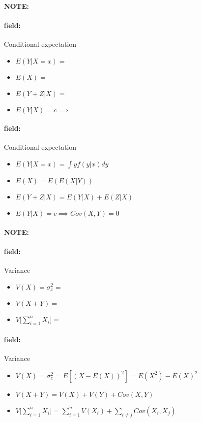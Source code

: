 \documentclass[12pt]{article}
\newenvironment{note}{\paragraph{NOTE:}}{}
\newenvironment{field}{\paragraph{field:}}{}
\begin{document}
\begin{note}
  \begin{field}
    Conditional expectation
      \begin{itemize}
        \item $E(Y|X = x) = $
        \item $E(X) = $
        \item $E(Y+Z|X) = $
        \item $E(Y|X) = c \implies $
      \end{itemize}
  \end{field}
  \begin{field}
    Conditional expectation
      \begin{itemize}
        \item $E(Y|X = x) = \int y f(y|x) dy$
        \item $E(X) = E(E(X|Y))$
        \item $E(Y+Z|X) = E(Y|X) + E(Z|X)$
        \item $E(Y|X) = c \implies Cov(X,Y) = 0$
      \end{itemize}

  \end{field}
\end{note}


\begin{note}
  \begin{field}
    Variance
    \begin{itemize}
      \item $V(X) = \sigma_x^2 = $
      \item $V(X+Y) =$
      \item $V\bigg[\sum_{i=1}^n X_i\bigg] = $
    \end{itemize}
  \end{field}
  \begin{field}
    Variance
    \begin{itemize}
      \item $V(X) = \sigma_x^2 = E[(X - E(X))^2] = E(X^2) - E(X)^2$
      \item $V(X+Y) = V(X) + V(Y) + Cov(X,Y)$
      \item $V\bigg[\sum_{i=1}^n X_i\bigg] = \sum_{i=1}^n V(X_i) + \sum_{i\neq j} Cov(X_i,X_j)$
    \end{itemize}
  \end{field}
\end{note}
\end{document}
